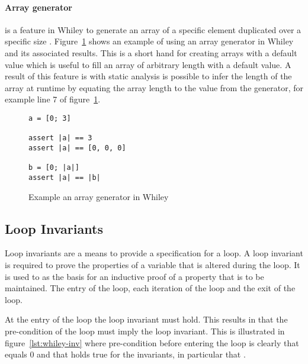 \paragraph{Array generator} is a feature in Whiley to generate an array
of a specific element duplicated over a specific size \cite{whiley-spec}
\cite{whiley-arrays}.
Figure~\ref{lst:whiley-array-gen} shows an example of using an array generator
in Whiley and its associated results.
This is a short hand for creating arrays with a default value which is useful
to fill an array of arbitrary length with a default value.
A result of this feature is with static analysis is possible to infer the 
length of the array at runtime by equating the array length to the value
from the generator, for example line 7 of figure~\ref{lst:whiley-array-gen}.

\begin{figure}[ht]
\begin{lstlisting}
a = [0; 3]

assert |a| == 3
assert |a| == [0, 0, 0]

b = [0; |a|]
assert |a| == |b|
\end{lstlisting}
    \caption{Example an array generator in Whiley}
    \label{lst:whiley-array-gen}
\end{figure}

\subsection{Loop Invariants}

Loop invariants are a means to provide a specification for a loop.
A loop invariant is required to prove the properties of a variable
that is altered during the loop.
It is used to as the basis for an inductive proof of a
property that is to be maintained.
The entry of the loop, each iteration of the loop and the exit of the
loop.

At the entry of the loop the loop invariant must hold.
This results in that the pre-condition of the loop must imply
the loop invariant.
This is illustrated in figure~\ref{lst:whiley-inv} where pre-condition
before entering the loop is clearly that  equals 0 and that holds
true for the invariants, in particular that .

